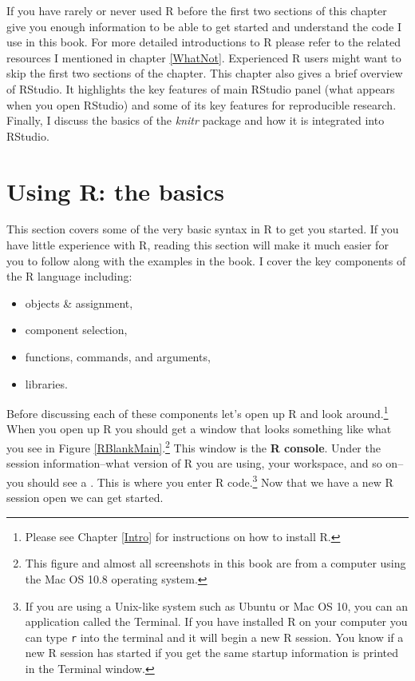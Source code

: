 \documentclass[ChapterTOCs,krantz1]{krantz}\usepackage{graphicx, color}
\begin{document}
If you have rarely or never used R before the first two sections of this chapter give you enough information to be able to get started and understand the code I use in this book. For more detailed introductions to R please refer to the related resources I mentioned in chapter \ref{WhatNot}. Experienced R users might want to skip the first two sections of the chapter. This chapter also gives a brief overview of RStudio. It highlights the key features of main RStudio panel (what appears when you open RStudio) and some of its key features for reproducible research. Finally, I discuss the basics of the {\emph{knitr}} package and how it is integrated into RStudio.

\section{Using R: the basics}

This section covers some of the very basic syntax in R to get you started. If you have little experience with R, reading this section will make it much easier for you to follow along with the examples in the book. I cover the key components of the R language including:

\begin{itemize}
    \item objects \& assignment,
    \item component selection,
    \item functions, commands, and arguments,
    \item libraries.
\end{itemize}

Before discussing each of these components let's open up R and look around.\footnote{Please see Chapter \ref{Intro} for instructions on how to install R.} When you open up R you should get a window that looks something like what you see in Figure \ref{RBlankMain}.\footnote{This figure and almost all screenshots in this book are from a computer using the Mac OS 10.8 operating system.} This window is the {\bf{R console}}. Under the session information--what version of R you are using, your workspace, and so on--you should see a {\tt{\greaterthan}}. This is where you enter R code.\footnote{If you are using a Unix-like system such as Ubuntu or Mac OS 10, you can an application called the Terminal. If you have installed R on your computer you can type {\tt{r}} into the terminal and it will begin a new R session. You know if a new R session has started if you get the same startup information is printed in the Terminal window.} Now that we have a new R session open we can get started. 
\end{document}
